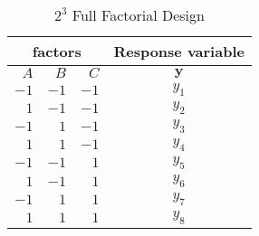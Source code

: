 \documentclass{beamer}
\begin{document}
\begin{frame}

\begin{table}
\caption{$2^{3}$ Full Factorial Design}
\begin{tabular}{rrr|>{\onslide<2->}c<{\onslide}}
\multicolumn{3}{c}{factors} & Response variable\\ \hline
$A$&$B$&$C$&$\mathbf{y}$\\ \hline
$-1$ & $-1$ & $-1$  &$y_{1}$\\ 
$1$ &  $-1$ & $-1$ &$y_{2}$   \\ 
$-1$ & $1$ & $-1$&$y_{3}$    \\ 
$1$ &  $1$ & $-1$&$y_{4}$ \\
$-1$ & $-1$ & $1$&$y_{5}$\\
$1$ &  $-1$ & $1$ & $y_{6}$\\
$-1$ & $1$ & $1$&$y_{7}$\\
$1$ &  $1$ &  $1$&$y_{8}$\\
\end{tabular}
\end{table}

\end{frame}
\end{document}
